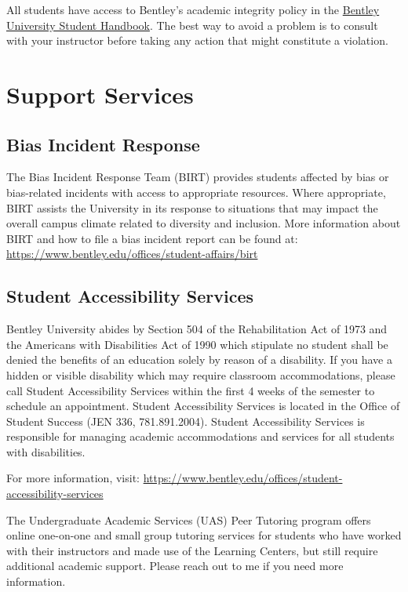 \documentclass[11pt,letterpaper]{article}
\begin{document}
All students have access to Bentley's academic integrity policy in the \href{https://bentleydownloads.s3.amazonaws.com/registrar/Bentley+University+Student+Handbook+2025-2026.pdf}{Bentley University Student Handbook}. The best way to avoid a problem is to consult with your instructor before taking any action that might constitute a violation.

\section*{Support Services}

\subsection*{Bias Incident Response}
The Bias Incident Response Team (BIRT) provides students affected by bias or bias-related incidents with access to appropriate resources. Where appropriate, BIRT assists the University in its response to situations that may impact the overall campus climate related to diversity and inclusion. More information about BIRT and how to file a bias incident report can be found at: \url{https://www.bentley.edu/offices/student-affairs/birt}

\subsection*{Student Accessibility Services}
Bentley University abides by Section 504 of the Rehabilitation Act of 1973 and the Americans with Disabilities Act of 1990 which stipulate no student shall be denied the benefits of an education solely by reason of a disability. If you have a hidden or visible disability which may require classroom accommodations, please call Student Accessibility Services within the first 4 weeks of the semester to schedule an appointment. Student Accessibility Services is located in the Office of Student Success (JEN 336, 781.891.2004). Student Accessibility Services is responsible for managing academic accommodations and services for all students with disabilities.

For more information, visit: \url{https://www.bentley.edu/offices/student-accessibility-services}

The Undergraduate Academic Services (UAS) Peer Tutoring program offers online one-on-one and small group tutoring services for students who have worked with their instructors and made use of the Learning Centers, but still require additional academic support. Please reach out to me if you need more information.
\end{document}
